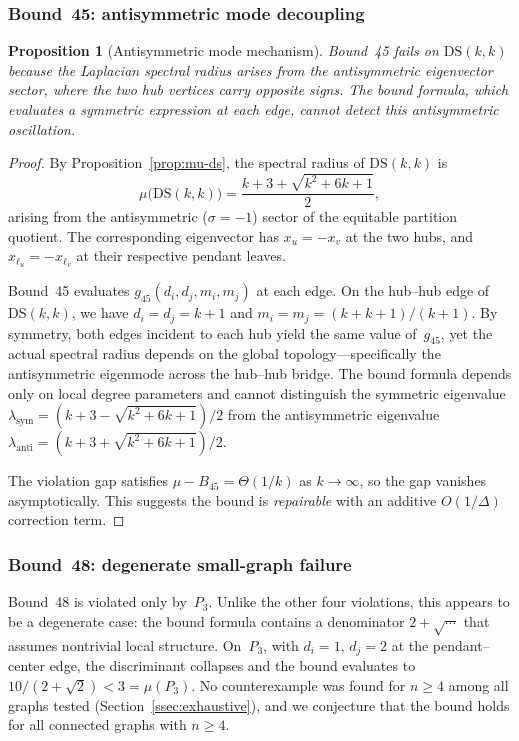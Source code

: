 \documentclass[preprint,12pt]{elsarticle}
\newtheorem{proposition}[theorem]{Proposition}
\theoremstyle{definition}
\theoremstyle{remark}
\newcommand{\DS}{\mathrm{DS}}          %
\newcommand{\Lspec}{\mu}               %
\begin{document}
\subsubsection{Bound~45: antisymmetric mode decoupling}\label{sssec:bound45}

\begin{proposition}[Antisymmetric mode mechanism]\label{prop:bound45-mechanism}
  Bound~45 fails on $\DS(k,k)$ because the Laplacian spectral radius arises
  from the antisymmetric eigenvector sector, where the two hub vertices carry
  opposite signs.  The bound formula, which evaluates a symmetric expression
  at each edge, cannot detect this antisymmetric oscillation.
\end{proposition}

\begin{proof}
  By Proposition~\ref{prop:mu-ds}, the spectral radius of $\DS(k,k)$ is
  \[
    \Lspec\bigl(\DS(k,k)\bigr) = \frac{k + 3 + \sqrt{k^2 + 6k + 1}}{2},
  \]
  arising from the antisymmetric ($\sigma = -1$) sector of the equitable
  partition quotient.  The corresponding eigenvector has $x_{u} = -x_{v}$
  at the two hubs, and $x_{\ell_u} = -x_{\ell_v}$ at their respective
  pendant leaves.

  Bound~45 evaluates $g_{45}(d_i, d_j, m_i, m_j)$ at each edge.  On the
  hub--hub edge of $\DS(k,k)$, we have $d_i = d_j = k+1$ and
  $m_i = m_j = (k + k{+}1)/(k{+}1)$.  By symmetry, both edges
  incident to each hub yield the same value of~$g_{45}$,
  yet the actual spectral radius depends on the global
  topology---specifically the antisymmetric eigenmode across the
  hub--hub bridge.  The bound formula
  depends only on local degree parameters and cannot distinguish the
  symmetric eigenvalue
  $\lambda_{\mathrm{sym}} = (k{+}3 - \sqrt{k^2{+}6k{+}1})/2$ from the
  antisymmetric eigenvalue
  $\lambda_{\mathrm{anti}} = (k{+}3{+}\sqrt{k^2{+}6k{+}1})/2$.

  The violation gap satisfies
  $\Lspec - B_{45} = \Theta(1/k)$ as $k \to \infty$,
  so the gap vanishes asymptotically.  This suggests the bound is
  \emph{repairable} with an additive $O(1/\Delta)$ correction term.
\end{proof}

\subsubsection{Bound~48: degenerate small-graph failure}\label{sssec:bound48}

Bound~48 is violated only by~$P_3$.  Unlike the other four violations,
this appears to be a degenerate case: the bound formula contains a
denominator $2 + \sqrt{\cdots}$ that assumes nontrivial local structure.
On~$P_3$, with $d_i = 1$, $d_j = 2$ at the pendant--center edge, the
discriminant collapses and the bound evaluates to
$10/(2+\sqrt{2}) < 3 = \Lspec(P_3)$.  No counterexample was found
for $n \geq 4$ among all graphs tested (Section~\ref{ssec:exhaustive}),
and we conjecture that the bound holds for all connected graphs
with $n \geq 4$.
\end{document}
